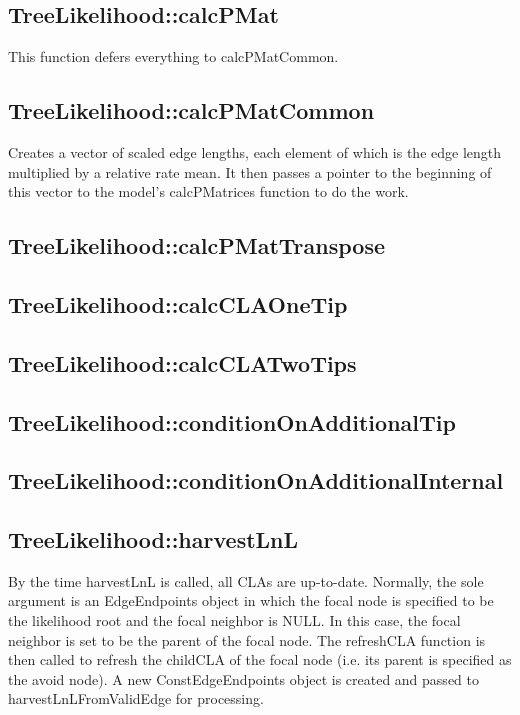 \subsection{TreeLikelihood::calcPMat}

This function defers everything to calcPMatCommon.

\subsection{TreeLikelihood::calcPMatCommon}

Creates a vector of scaled edge lengths, each element of which is the edge length multiplied by a relative rate mean. It then passes a pointer to the beginning of this vector to the model's calcPMatrices function to do the work.

\subsection{TreeLikelihood::calcPMatTranspose}

\subsection{TreeLikelihood::calcCLAOneTip}

\subsection{TreeLikelihood::calcCLATwoTips}

\subsection{TreeLikelihood::conditionOnAdditionalTip}

\subsection{TreeLikelihood::conditionOnAdditionalInternal}

\subsection{TreeLikelihood::harvestLnL}

By the time harvestLnL is called, all CLAs are up-to-date. Normally, the sole argument is an EdgeEndpoints object in which the focal node is specified to be the likelihood root and the focal neighbor is NULL. In this case, the focal neighbor is set to be the parent of the focal node. The refreshCLA function is then called to refresh the childCLA of the focal node (i.e. its parent is specified as the avoid node). A new ConstEdgeEndpoints object is created and passed to harvestLnLFromValidEdge for processing.

